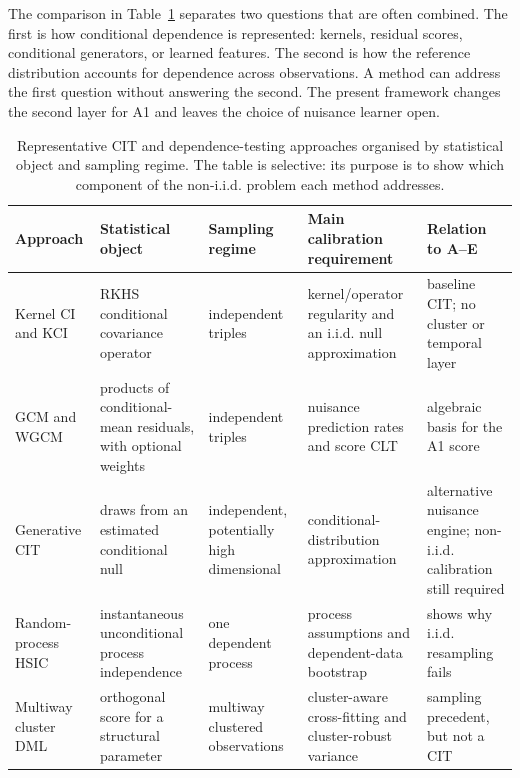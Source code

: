 \documentclass[11pt]{article}
\theoremstyle{definition}
\begin{document}
The comparison in Table~\ref{tab:literature-map} separates two questions that are often
combined. The first is how conditional dependence is represented: kernels, residual scores,
conditional generators, or learned features. The second is how the reference distribution
accounts for dependence across observations. A method can address the first question without
answering the second. The present framework changes the second layer for A1 and leaves the
choice of nuisance learner open.

\begin{table}[!ht]
\centering
\caption{Representative CIT and dependence-testing approaches organised by statistical
object and sampling regime. The table is selective: its purpose is to show which component
of the non-i.i.d. problem each method addresses.}
\label{tab:literature-map}
\scriptsize
\setlength{\tabcolsep}{3pt}
\sloppy
\begin{tabularx}{\textwidth}{>{\raggedright\arraybackslash}p{}
                              >{\raggedright\arraybackslash}p{}
                              >{\raggedright\arraybackslash}p{}
                              >{\raggedright\arraybackslash}p{}
                              >{\raggedright\arraybackslash}X}
\toprule
Approach & Statistical object & Sampling regime & Main calibration requirement & Relation to A--E \\
\midrule
Kernel CI and KCI \cite{fukumizu2007,zhang2011} & RKHS conditional covariance operator & independent triples & kernel/operator regularity and an i.i.d. null approximation & baseline CIT; no cluster or temporal layer \\
GCM and WGCM \cite{shahpeters,scheidegger2022} & products of conditional-mean residuals, with optional weights & independent triples & nuisance prediction rates and score CLT & algebraic basis for the A1 score \\
Generative CIT \cite{bellot2019} & draws from an estimated conditional null & independent, potentially high dimensional & conditional-distribution approximation & alternative nuisance engine; non-i.i.d. calibration still required \\
Random-process HSIC \cite{chwialkowski2014} & instantaneous unconditional process independence & one dependent process & process assumptions and dependent-data bootstrap & shows why i.i.d. resampling fails \\
Multiway cluster DML \cite{chiang2022} & orthogonal score for a structural parameter & multiway clustered observations & cluster-aware cross-fitting and cluster-robust variance & sampling precedent, but not a CIT \\

\end{tabularx}
\end{table}
\end{document}
